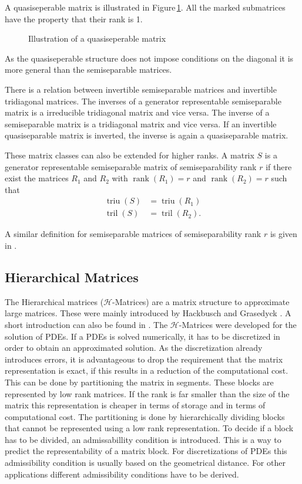 \documentclass[doctype=mastersthesis,BCOR=15mm,biblatex]{ldvbook}%
\DeclareMathOperator{\rank}{rank}
\DeclareMathOperator{\triu}{triu}
\DeclareMathOperator{\tril}{tril}
\begin{document}
A quasiseperable matrix is illustrated in Figure\,\ref{fig:quasiseperable}. All the marked submatrices have the property that their rank is 1.
\begin{figure}
	\centering
	
	\caption{Illustration of a quasiseperable matrix}
	\label{fig:quasiseperable}
\end{figure}
As the quasiseperable structure does not impose conditions on the diagonal it is more general than the semiseparable matrices.

There is a relation between invertible semiseparable matrices and invertible tridiagonal matrices.
The inverses of a generator representable semiseparable matrix is a irreducible tridiagonal matrix and vice versa. 
The inverse of a semiseparable matrix is a tridiagonal matrix and vice versa.
If an invertible quasiseparable matrix is inverted, the inverse is again a quasiseparable matrix.

These matrix classes can also be extended for higher ranks.
A matrix $S$ is a generator representable semiseparable matrix of semiseparability rank $r$ if there exist the matrices $R_1$ and $R_2$ with $\rank(R_1)=r$ and $\rank(R_2)=r$ such that
\begin{align}
\triu(S) &= \triu(R_1)\\
\tril(S) &= \tril(R_2)
.
\end{align}

A similar definition for semiseparable matrices of semiseparability rank $r$ is given in \cite{vandebril_bibliography_2005}.

\subsection{Hierarchical Matrices}\label{subsec:H-mat}
The Hierarchical matrices ($\mathcal{H}$-Matrices) are a matrix structure to approximate large matrices. These were mainly introduced by Hackbusch \cite{hackbusch_hierarchische_2009} and Grasedyck \cite{grasedyck_theorie_2001}.
A short introduction can also be found in \cite{grasedyck_adaptive_2004}.
The $\mathcal{H}$-Matrices were developed for the solution of PDEs.
If a PDEs is solved numerically, it has to be discretized in order to obtain an approximated solution.
As the discretization already introduces errors, it is advantageous to drop the requirement that the matrix representation is exact, if this results in a reduction of the computational cost.
This can be done by partitioning the matrix in segments. These blocks are represented by low rank matrices. If the rank is far smaller than the size of the matrix this representation is cheaper in terms of storage and in terms of computational cost.
The partitioning is done by hierarchically dividing blocks that cannot be represented using a low rank representation.
To decide if a block has to be divided, an admissabillity condition is introduced.
This is a way to predict the representability of a matrix block.
For discretizations of PDEs this admissibility condition is usually based on the geometrical distance.
For other applications different admissibility conditions have to be derived.
\end{document}
